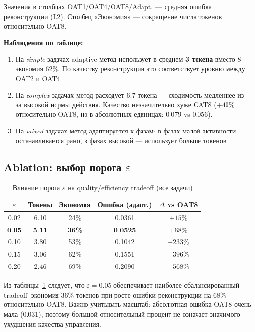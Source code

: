 \documentclass[12pt,a4paper]{article}
\begin{document}
Значения в столбцах OAT1/OAT4/OAT8/Adapt. --- средняя ошибка реконструкции (L2).
Столбец «Экономия» --- сокращение числа токенов относительно OAT8.

\textbf{Наблюдения по таблице:}
\begin{enumerate}[leftmargin=1.4cm]
    \item На \textit{simple} задачах adaptive метод использует в среднем \textbf{3 токена}
          вместо 8 --- экономия 62\%. По качеству реконструкции это соответствует
          уровню между OAT2 и OAT4.
    \item На \textit{complex} задачах метод расходует 6.7 токена --- сходимость
          медленнее из-за высокой нормы действия. Качество незначительно хуже OAT8
          ($+40\%$ относительно OAT8, но в абсолютных единицах: $0.079$ vs $0.056$).
    \item На \textit{mixed} задачах метод адаптируется к фазам: в фазах малой
          активности останавливается рано, в фазах высокой --- использует больше токенов.
\end{enumerate}

\subsection{Ablation: выбор порога $\varepsilon$}

\begin{table}[h!]
\centering
\caption{Влияние порога $\varepsilon$ на quality/efficiency tradeoff (все задачи)}
\label{tab:ablation}
\begin{tabular}{ccccc}
\toprule
$\varepsilon$ & \textbf{Токены} & \textbf{Экономия} & \textbf{Ошибка (адапт.)} & \textbf{$\Delta$ vs OAT8} \\
\midrule
0.02 & 6.10 & 24\% & 0.0361 & $+15\%$ \\
\textbf{0.05} & \textbf{5.11} & \textbf{36\%} & \textbf{0.0525} & $+68\%$ \\
0.10 & 3.80 & 53\% & 0.1042 & $+233\%$ \\
0.15 & 3.06 & 62\% & 0.1551 & $+396\%$ \\
0.20 & 2.46 & 69\% & 0.2090 & $+568\%$ \\
\bottomrule
\end{tabular}
\end{table}

Из таблицы~\ref{tab:ablation} следует, что $\varepsilon = 0.05$ обеспечивает
наиболее сбалансированный tradeoff: экономия 36\% токенов при росте ошибки
реконструкции на 68\% относительно OAT8. Важно учитывать масштаб: абсолютная
ошибка OAT8 очень мала (0.031), поэтому большой относительный процент не
означает значимого ухудшения качества управления.
\end{document}
